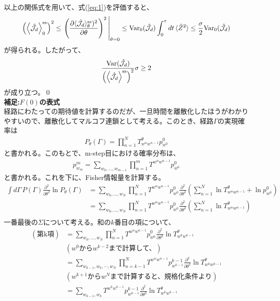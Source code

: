 \documentclass[a4paper,11pt]{jsarticle}
\numberwithin{equation}{section}
\begin{document}
以上の関係式を用いて、式(\ref{eq:1})を評価すると、
\begin{align}
    \qty(\ev{\hat{\mathcal{J}}_{d}}^{\text{ss}}_{0})^2\leq \eval{\left( \frac{\partial \langle {\hat{\mathcal{J}}_{d}} \rangle_\theta^{\text{ss}})^2}{\partial \theta} \right)^2}_{\theta = 0}
    \leq \mathrm{Var}_{0} (\hat{\mathcal{J}}_{d}) \int_0^\tau dt \, \langle \hat{Z}^2 \rangle \leq \frac{{\sigma}}{2} \mathrm{Var}_0 (\hat{\mathcal{J}}_{d})
\end{align}
が得られる。したがって、
\begin{align}
    \frac{\mathrm{Var}(\hat{\mathcal{J}}_{d})}{\qty(\ev{\hat{\mathcal{J}}_{d}}^{\text{ss}})^2} \sigma \geq 2
\end{align}
が成り立つ。\qed\\

\textbf{補足:$F(0)$の表式}\\
経路にわたっての期待値を計算するのだが、一旦時間を離散化したほうがわかりやすいので、離散化してマルコフ連鎖として考える。このとき、経路$\Gamma$の実現確率は
\begin{align}
    P_\theta(\Gamma) = \prod_{n=1}^N T^\theta_{w^n w^{n-1}} p^0_{w^0}
\end{align}
と書かれる。このもとで、m-step目における確率分布は、
\begin{align}
    p^m_{w_m} = \sum_{w_0, \dots, w_{m-1}} \prod_{n=1}^m T^{w^n w^{n-1}} p^0_{w^0}
\end{align}
と書かれる。これを下に、Fisher情報量を計算する。
\begin{align}
    \int d\Gamma \, P(\Gamma) \frac{\partial^2}{\partial \theta^2} \ln P_\theta(\Gamma) 
    &= \sum_{w_0, \dots, w_N} \prod_{n=1}^N T^{w^n w^{n-1}} p^0_{w^0} 
    \frac{\partial^2}{\partial \theta^2} 
    \left(
        \sum_{n=1}^N \ln T^\theta_{w^n w^{n-1}} + \ln p^0_{w^0}
    \right) \\
    &= \sum_{w_0, \dots, w_N} \prod_{n=1}^N T^{w^n w^{n-1}} p^0_{w^0} 
    \frac{\partial^2}{\partial \theta^2} 
    \left(
        \sum_{n=1}^N \ln T^\theta_{w^n w^{n-1}}
    \right) \\
\end{align}
一番最後の$\Sigma$について考える。和の$k$番目の項について、
\begin{align}
    (\text{第k項}) &= \sum_{w_0, \dots, w_N} \prod_{n=1}^N T^{w^n w^{n-1}} p^0_{w^0} \frac{\partial^2}{\partial \theta^2} \ln T^\theta_{w^k w^{k-1}} \\
    &(w^{0}\text{から}w^{k-2}\text{まで計算して、}) \nonumber \\
    &= \sum_{w_{k-1}, w_k,\cdots, w_N} \prod_{n=k-1}^N T^{w^n w^{n-1}} p^{k-1}_{w^{k-1}}\frac{\partial^2}{\partial \theta^2} \ln T^\theta_{w^k w^{k-1}} \\
    &(w^{k+1}\text{から}w^{N}\text{まで計算すると、規格化条件より}) \nonumber \\
    &= \sum_{w_{k-1}, w_k} T^{w^k w^{k-1}} p^{k-1}_{w^{k-1}}\frac{\partial^2}{\partial \theta^2} \ln T^\theta_{w^k w^{k-1}} 
\end{align}
\end{document}
